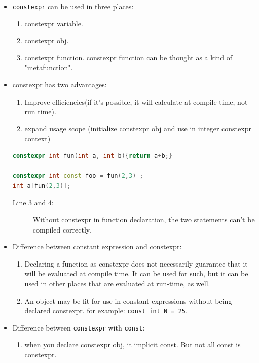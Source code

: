 \documentclass[a4paper,11pt,twoside]{book}
\begin{document}
\begin{itemize}
	\item \texttt{constexpr} can be used in three places: 
\begin{enumerate}
	\item constexpr variable.
	\item constexpr obj.
	\item constexpr function. constexpr function can be thought as a kind of "metafunction".
\end{enumerate}

	\item constexpr has two advantages:
\begin{enumerate}
	\item Improve efficiencies(if it's possible, it will calculate at compile time, not run time). 
	
	\item expand usage scope (initialize constexpr obj and use in integer constexpr context)
\end{enumerate}
\begin{lstlisting}[frame=single, language=c++]
constexpr int fun(int a, int b){return a+b;}

constexpr int const foo = fun(2,3) ; 
int a[fun(2,3)];
\end{lstlisting}
\begin{description}
	\item[Line 3 and 4:] Without constexpr in function declaration, the two statements can't be compiled correctly.
\end{description}

	\item Difference between constant expression and constexpr:
	\begin{enumerate}
		\item Declaring a function as constexpr does not necessarily guarantee that it will be evaluated at compile time. It can be used for such, but it can be used in other places that are evaluated at run-time, as well.
		
		\item An object may be fit for use in constant expressions without being declared constexpr. for example: \texttt{const int N = 25}.
	\end{enumerate}

	\item Difference between \texttt{constexpr} with \texttt{const}:
	\begin{enumerate}
		\item when you declare constexpr obj, it implicit const. But not all const is constexpr.
		

\end{enumerate}
\end{itemize}
\end{document}

